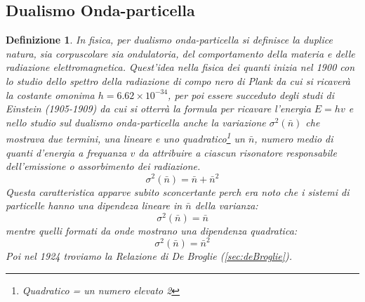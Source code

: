 \documentclass{book}
\newtheorem{defi}{Definizione}[section]
\begin{document}
\subsection{Dualismo Onda-particella}
\label{sec:dualismoOnda-part}
\begin{defi}
  In fisica, per dualismo onda-particella si definisce la duplice natura, sia corpuscolare sia ondulatoria, del
  comportamento della materia e delle radiazione elettromagnetica. Quest'idea nella fisica dei quanti inizia nel
  1900 con lo studio dello spettro della radiazione di compo nero di Plank da cui si ricaverà la costante omonima
  $h=6.62\times 10^{-34}$, per poi essere succeduto degli studi di Einstein (1905-1909) da cui si otterrà la formula
  per ricavare l'energia $E=hv$ e nello studio sul dualismo onda-particella anche la variazione $\sigma^2(\bar{n})$
  che mostrava due termini, una lineare e uno quadratico\footnote{Quadratico = un numero elevato 2} un $\bar{n}$,
  numero medio di quanti d'energia a frequanza $v$ da attribuire a ciascun risonatore responsabile dell'emissione
  o assorbimento dei radiazione.
  \begin{equation}
    \label{eq:numeromediodiquanti}
    \sigma^2(\bar{n})=\bar{n}+\bar{n}^2
  \end{equation}
  Questa caratteristica apparve subito sconcertante perch era noto che i sistemi di particelle hanno una dipendeza
  lineare in $\bar{n}$ della varianza:
  \begin{equation}
    \label{eq:rapportodipendenteadn}
    \sigma^2(\bar{n})=\bar{n}
  \end{equation}
  mentre quelli formati da onde mostrano una dipendenza quadratica:
  \begin{equation}
    \label{eq:ondedipendenzaquadratica}
    \sigma^2(\bar{n})=\bar{n}^2
  \end{equation}
  Poi nel 1924 troviamo la Relazione di De Broglie (\ref{sec:deBroglie}).
\end{defi}
\end{document}
